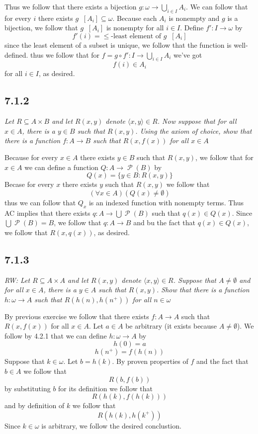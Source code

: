 \documentclass[11pt,oneside,titlepage]{book}
\DeclareMathOperator \pow {\mathcal {P}}
\DeclareMathOperator \inv {^{-1}}
\newcommand{\eangle}[1]{\langle #1 \rangle}
\newcommand{\set}[1]{\{ #1 \}}
\begin{document}
Thus we follow that there exists a bijection $g: \omega \to \bigcup_{i \in I}{A_i}$.
We can follow that for every $i$ there exists $g\inv[A_i] \subseteq \omega$.
Because each $A_i$ is nonempty and $g$ is a bijection, we follow that $g\inv[A_i]$ is
nonempty for all $i \in I$. Define $f': I \to \omega$ by
$$f'(i) = \text{$\leq$-least element of $g\inv[A_i]$}$$
since the least element of a subset is unique, we follow that the function is well-defined.
thus we follow that for $f = g \circ f': I \to \bigcup_{i \in I}{A_i}$ we've got
$$f(i) \in A_i$$
for all $i \in I$, as desired.

\subsection*{7.1.2}

\textit{Let $R \subseteq A \times B$ and let $R(x, y)$ denote $\eangle{x, y} \in R$. Now
  suppose that for all $x \in A$, there is a $y \in B$ such that $R(x, y)$. Using the
  axiom of choice, show that there is a function $f: A \to B$ such that $R(x, f(x))$
  for all $x \in A$}

Because for every $x \in A$ there exists $y \in B$ such that $R(x, y)$, we follow that
for $x \in A$ we can define a function $Q: A \to \pow(B)$ by
$$Q(x) = \set{y \in B: R(x, y)}$$
Becase for every $x$ there exists $y$ such that $R(x, y)$ we follow that
$$(\forall x \in A)(Q(x) \neq \emptyset)$$
thus we can follow that $Q_x$ is an indexed function with nonempty terms. Thus AC implies that
there exists $q: A \to \bigcup{\pow(B)}$ such that $q(x) \in Q(x)$. Since
$\bigcup{\pow(B)} = B$, we follow that $q: A \to B$ and bu the fact that $q(x) \in Q(x)$, we
follow that $R(x, q(x))$, as desired.

\subsection*{7.1.3}

\textit{RW: Let $R \subseteq A \times A$ and let $R(x, y)$ denote $\eangle{x, y} \in R$.
  Suppose that  $A \neq \emptyset$ and for all $x \in A$, there is a $y \in A$ such that $R(x, y)$.
  Show that there is a function $h: \omega \to A$ such that $R(h(n), h(n^+))$ for all $n \in
  \omega$ }

By previous exercise we follow that there exists $f: A \to A$ such that
$R(x, f(x))$ for all $x \in A$. Let $a \in A$ be arbitrary (it exists because $A \neq \emptyset$).
We follow by 4.2.1 that we can define
$h: \omega \to A$ by
$$h(0) = a$$
$$h(n^+) = f(h(n))$$
Suppose that $k \in \omega$. Let $b = h(k)$. By proven properties of $f$ and the fact that
$b \in A$ we  follow that
$$R(b, f(b))$$
by substituting $b$ for its definition we follow that
$$R(h(k), f(h(k)))$$
and by definition of $k$ we follow that
$$R(h(k), h(k^+))$$
Since $k \in \omega$  is arbitrary, we follow the desired conclustion.
\end{document}
